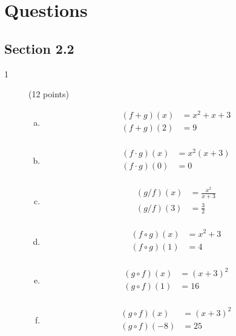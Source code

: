 \documentclass{exam}
\begin{document}
\section{Questions}

\subsection{Section 2.2}
\begin{description}
\item[1] (12 points)
\begin{enumerate}[(a)]

\item 
\begin{align*}
  (f + g)(x) &= x^2 + x + 3 \\
  (f + g)(2) &= 9 \\
\end{align*} 

\item 
\begin{align*}
  (f \cdot g)(x) &= x^2(x + 3) \\
  (f \cdot g)(0) &= 0 \\
\end{align*} 

\item 
\begin{align*}
  (g / f )(x) &= \frac{x^2}{x + 3} \\
  (g / f )(3) &= \frac{3}{2} \\
\end{align*} 

\item 
\begin{align*}
  (f \circ g)(x) &= x^2 + 3 \\
  (f \circ g)(1) &= 4 \\
\end{align*} 

\item 
\begin{align*}
  (g \circ f)(x) &= (x + 3)^2 \\
  (g \circ f)(1) &= 16 \\
\end{align*} 

\item 
\begin{align*}
  (g \circ f)(x) &= (x + 3)^2 \\
  (g \circ f)(-8) &= 25 \\
\end{align*} 


\end{enumerate}
\end{description}
\end{document}
